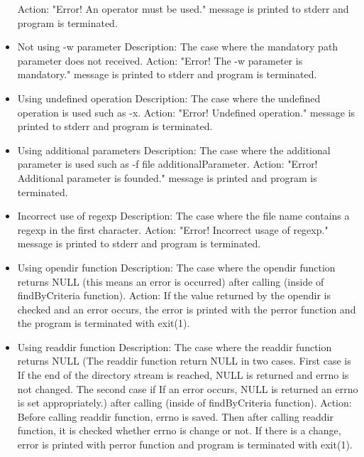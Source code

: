 \documentclass{article}
\begin{document}
\begin{itemize}
\newline
Action: "Error! An operator must be used." message is printed to stderr and program is terminated.
\item Not using -w parameter
\newline
Description: The case where the mandatory path parameter does not received.
\newline
Action: "Error! The -w parameter is mandatory." message is printed to stderr and program is terminated.
\item Using undefined operation
\newline
Description: The case where the undefined operation is used such as -x.
\newline
Action: "Error! Undefined operation." message is printed to stderr and program is terminated.
\item Using additional parameters
\newline
Description: The case where the additional parameter is used such as -f file additionalParameter.
\newline
Action: "Error! Additional parameter is founded." message is printed and program is terminated.
\item Incorrect use of regexp
\newline
Description: The case where the file name contains a regexp in the first character.
\newline
Action: "Error! Incorrect usage of regexp." message is printed to stderr and program is terminated.
\item Using opendir function
\newline
Description: The case where the opendir function returns NULL (this means an error is occurred) after calling (inside of findByCriteria function).
\newline
Action: If the value returned by the opendir is checked and an error occurs, the error is printed with the perror function and the program is terminated with exit(1).
\item Using readdir function
\newline
Description: The case where the readdir function returns NULL (The readdir function return NULL in two cases. First case is If the end of the directory stream is reached, NULL is returned and errno is not changed. The second case if If an error occurs, NULL is returned an errno is set appropriately.) after calling (inside of findByCriteria function).
\newline
Action: Before calling readdir function, errno is saved. Then after calling readdir function, it is checked whether errno is change or not. If there is a change, error is printed with perror function and program is terminated with exit(1).

\end{itemize}
\end{document}

